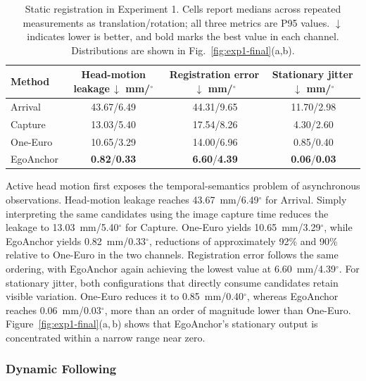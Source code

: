 \documentclass[review]{vgtc}
\begin{document}
\begin{table}[t]
\centering
\caption{Static registration in Experiment 1. Cells report medians across repeated measurements as translation/rotation; all three metrics are P95 values. $\downarrow$ indicates lower is better, and bold marks the best value in each channel. Distributions are shown in Fig.~\ref{fig:exp1-final}(a,b).}
\label{tab:exp1-static}
\begin{tabular}{@{}lccc@{}}
\toprule
Method & \shortstack{Head-motion\\leakage\,$\downarrow$\\mm/$^\circ$} & \shortstack{Registration\\error\,$\downarrow$\\mm/$^\circ$} & \shortstack{Stationary\\jitter\,$\downarrow$\\mm/$^\circ$} \\
\midrule
Arrival & 43.67/6.49 & 44.31/9.65 & 11.70/2.98 \\
Capture & 13.03/5.40 & 17.54/8.26 & 4.30/2.60 \\
One-Euro & 10.65/3.29 & 14.00/6.96 & 0.85/0.40 \\
EgoAnchor & \textbf{0.82}/\textbf{0.33} & \textbf{6.60}/\textbf{4.39} & \textbf{0.06}/\textbf{0.03} \\
\bottomrule
\end{tabular}
\end{table}

Active head motion first exposes the temporal-semantics problem of asynchronous observations. Head-motion leakage reaches 43.67~mm/6.49$^\circ$ for Arrival. Simply interpreting the same candidates using the image capture time reduces the leakage to 13.03~mm/5.40$^\circ$ for Capture. One-Euro yields 10.65~mm/3.29$^\circ$, while EgoAnchor yields 0.82~mm/0.33$^\circ$, reductions of approximately 92\% and 90\% relative to One-Euro in the two channels. Registration error follows the same ordering, with EgoAnchor again achieving the lowest value at 6.60~mm/4.39$^\circ$. For stationary jitter, both configurations that directly consume candidates retain visible variation. One-Euro reduces it to 0.85~mm/0.40$^\circ$, whereas EgoAnchor reaches 0.06~mm/0.03$^\circ$, more than an order of magnitude lower than One-Euro. Figure~\ref{fig:exp1-final}(a,\,b) shows that EgoAnchor's stationary output is concentrated within a narrow range near zero.

\subsubsection{Dynamic Following}
\end{document}
